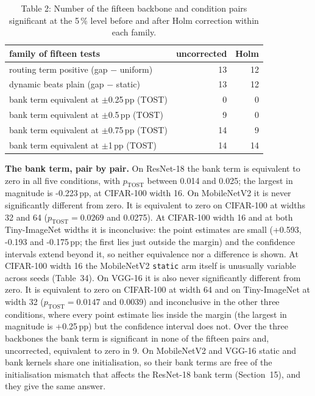 \documentclass{article}
\begin{document}
\begin{table}
\caption{Table 2: Number of the fifteen backbone and condition pairs significant at
the 5\,\% level before and after Holm correction within each family.}

\begin{tabular}{l rr}
\toprule
family of fifteen tests & uncorrected & Holm \\
\midrule
routing term positive (gap − uniform) & 13 & 12 \\
dynamic beats plain (gap − static) & 13 & 12 \\
bank term equivalent at $\pm$0.25\,pp (TOST) & 0 & 0 \\
bank term equivalent at $\pm$0.5\,pp (TOST) & 9 & 0 \\
bank term equivalent at $\pm$0.75\,pp (TOST) & 14 & 9 \\
bank term equivalent at $\pm$1\,pp (TOST) & 14 & 14 \\
\bottomrule
\end{tabular}
\end{table}

\textbf{The bank term, pair by pair.}  On ResNet-18 the bank term is equivalent to
zero in all five conditions, with $p_{\text{TOST}}$ between 0.014 and
0.025; the largest in magnitude is -0.223\,pp, at CIFAR-100 width 16.
On MobileNetV2 it is never significantly different from zero. It is
equivalent to zero on CIFAR-100 at widths 32 and 64
($p_{\text{TOST}}=0.0269$ and 0.0275). At CIFAR-100 width 16
and at both Tiny-ImageNet widths it is inconclusive: the point estimates
are small (+0.593, -0.193 and -0.175\,pp; the first lies
just outside the margin) and the confidence intervals extend beyond it, so
neither equivalence nor a difference is shown. At CIFAR-100 width 16 the
MobileNetV2 \texttt{static} arm itself is unusually variable across seeds
(Table~34). On VGG-16 it is also never significantly
different from zero. It is equivalent to zero on CIFAR-100 at width 64 and
on Tiny-ImageNet at width 32 ($p_{\text{TOST}}=0.0147$ and
0.0039) and inconclusive in the other three conditions, where every
point estimate lies inside the margin (the largest in magnitude is
+0.25\,pp) but the confidence interval does not. Over the three
backbones the bank term is significant in none of the fifteen pairs and,
uncorrected, equivalent to zero in 9. On MobileNetV2 and VGG-16 static and
bank kernels share one initialisation, so their bank terms are free of
the initialisation mismatch that affects the ResNet-18 bank term
(Section~15), and they give the same answer.
\end{document}
